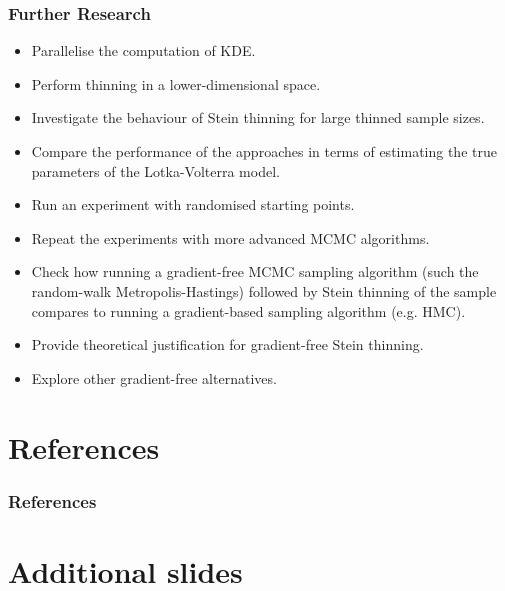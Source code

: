 \documentclass{beamer}
\begin{document}
\begin{frame}
\frametitle{Further Research}
\begin{itemize}

\item Parallelise the computation of KDE.

\item Perform thinning in a lower-dimensional space.

\item Investigate the behaviour of Stein thinning for large thinned sample sizes.

\item Compare the performance of the approaches in terms of estimating the true parameters of the Lotka-Volterra model.

\item Run an experiment with randomised starting points.

\item Repeat the experiments with more advanced MCMC algorithms. 

\item Check how running a gradient-free MCMC sampling algorithm (such the random-walk Metropolis-Hastings) followed by Stein thinning of the sample compares to running a gradient-based sampling algorithm (e.g. HMC).

\item Provide theoretical justification for gradient-free Stein thinning.

\item Explore other gradient-free alternatives.

\end{itemize}

\end{frame}




\section{References}

\begin{frame}[allowframebreaks]
\frametitle{References}

\fontsize{8pt}{12}\selectfont




\end{frame}



\section{Additional slides}
\end{document}
